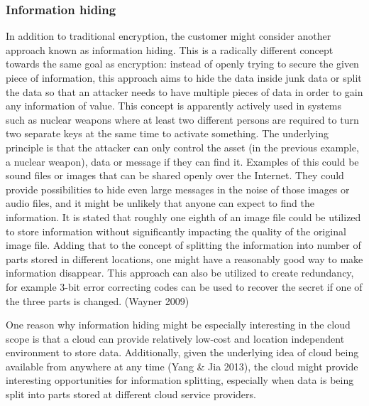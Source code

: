 \documentclass{article}
\begin{document}
\subsubsection{Information hiding}
In addition to traditional encryption, the customer might consider another approach known as information hiding. This is a radically different concept towards the same goal as encryption: instead of openly trying to secure the given piece of information, this approach aims to hide the data inside junk data or split the data so that an attacker needs to have multiple pieces of data in order to gain any information of value. This concept is apparently actively used in systems such as nuclear weapons where at least two different persons are required to turn two separate keys at the same time to activate something. The underlying principle is that the attacker can only control the asset (in the previous example, a nuclear weapon), data or message if they can find it. Examples of this could be sound files or images that can be shared openly over the Internet. They could provide possibilities to hide even large messages in the noise of those images or audio files, and it might be unlikely that anyone can expect to find the information. It is stated that roughly one eighth of an image file could be utilized to store information without significantly impacting the quality of the original image file. Adding that to the concept of splitting the information into number of parts stored in different locations, one might have a reasonably good way to make information disappear. This approach can also be utilized to create redundancy, for example 3-bit error correcting codes can be used to recover the secret if one of the three parts is changed. (Wayner 2009)
\par
One reason why information hiding might be especially interesting in the cloud scope is that a cloud can provide relatively low-cost and location independent environment to store data. Additionally, given the underlying idea of cloud being available from anywhere at any time (Yang \& Jia 2013), the cloud might provide interesting opportunities for information splitting, especially when data is being split into parts stored at different cloud service providers.
\end{document}
